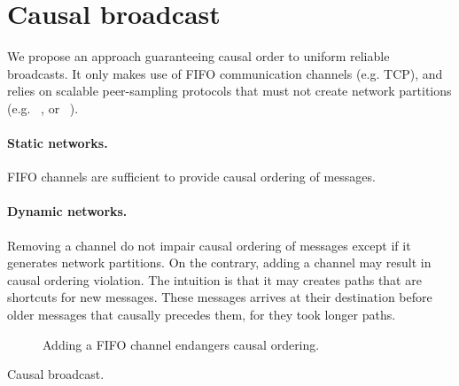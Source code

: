 
\section{Causal broadcast}
\label{sec:proposal}

We propose an approach guaranteeing causal order to uniform reliable
broadcasts. It only makes use of FIFO communication channels (e.g. TCP), and
relies on scalable peer-sampling protocols that must not create network partitions
(e.g. \SPRAY~\cite{nedelec2017adaptive}, or \CYCLON~\cite{voulgaris2005cyclon}).

\paragraph{Static networks.} FIFO channels are sufficient to provide causal
ordering of messages.


\paragraph{Dynamic networks.} Removing a channel do not impair causal ordering
of messages except if it generates network partitions. On the contrary, adding a
channel may result in causal ordering violation. The intuition is that it may
creates paths that are shortcuts for new messages. These messages arrives at
their destination before older messages that causally precedes them, for they
took longer paths.

\begin{figure}
  \begin{center}
    
    \caption{\label{fig:problem}Adding a FIFO channel endangers causal
      ordering.}
  \end{center}
\end{figure}



\begin{algorithm*}[h]
  
  \caption{\label{algo:causalbroadcast}Causal broadcast.}
\end{algorithm*}


